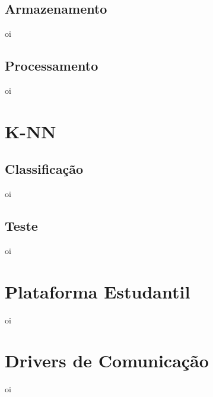     \subsection{Armazenamento}
    \label{sec:armazenamento}
    oi
    
    \subsection{Processamento}
    \label{sec:processamento}
    oi

\section{K-NN}
\label{sec:knn}
    \subsection{Classificação}
    \label{sec:classificacao}
    oi
    
    \subsection{Teste}
    \label{sec:teste}
    oi

\section{Plataforma Estudantil}
\label{sec:plataforma-estudantil}
oi

\section{Drivers de Comunicação}
\label{sec:drivers-comunicacao}
oi

